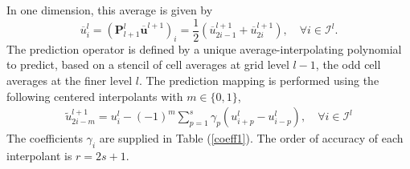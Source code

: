\documentclass[]{article}
\begin{document}
\appendix
 
        In one dimension, this
        average is given by
        \begin{equation}
            \overline{u}^{l}_{i} = \left( \bm{P}_{l+1}^{l}
            \overline{\bm{u}}^{l+1} \right)_{i} = \frac{1}{2} (
            \overline{u}^{l+1}_{2i-1} + \overline{u}^{l+1}_{2i} ), \quad \forall
            i \in \bm{\mathcal{I}}^{l}.
        \end{equation}
        The prediction operator is defined by a unique average-interpolating
        polynomial to predict, based on a stencil of cell averages at grid level
        $l-1$, the odd cell averages at the finer level $l$. The prediction
        mapping is performed using the following centered interpolants with
        $m\in\{0,1\}$,
        \begin{align}
            \tilde{u}_{2i-m}^{l+1} = u_{i}^{l} - (-1)^{m} \sum_{p=1}^{s} \gamma_{p} \left(
                u^{l}_{i+p} - u^{l}_{i-p} \right), \quad \forall i \in \bm{\mathcal{I}}^{l}
            \label{prediction}
        \end{align}
        The coefficients $\gamma_{i}$ are supplied in Table (\ref{coeff1}). The
        order of accuracy of each interpolant is $r=2s+1$.
 
\end{document}
